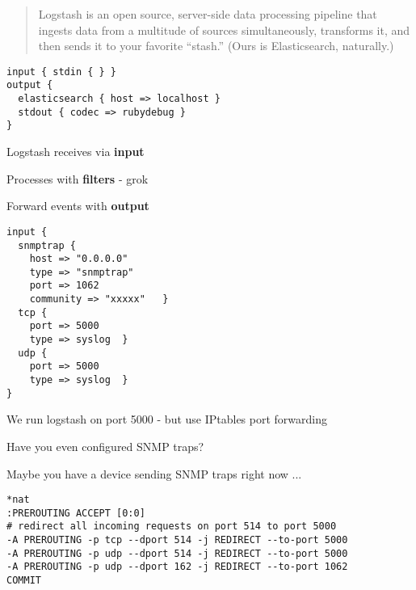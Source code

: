 \documentclass[Screen16to9,17pt]{foils}
\begin{document}

\begin{quote}
  Logstash is an open source, server-side data processing pipeline that ingests data from a multitude of sources simultaneously, transforms it, and then sends it to your favorite “stash.” (Ours is Elasticsearch, naturally.)\\
\end{quote}

\begin{verbatim}
input { stdin { } }
output {
  elasticsearch { host => localhost }
  stdout { codec => rubydebug }
}
\end{verbatim}



\begin{list2}
\item Logstash receives via {\bf input}
\item Processes with {\bf filters} - grok
\item Forward events with {\bf output}
\end{list2}



{\footnotesize
\begin{verbatim}
input {
  snmptrap {
    host => "0.0.0.0"
    type => "snmptrap"
    port => 1062
    community => "xxxxx"   }
  tcp {
    port => 5000
    type => syslog  }
  udp {
    port => 5000
    type => syslog  }
}
\end{verbatim}
}

\begin{list2}
\item We run logstash on port 5000 - but use IPtables port forwarding
\item Have you even configured SNMP traps?
\item Maybe you have a device sending SNMP traps right now ...
\end{list2}


{\footnotesize
\begin{verbatim}
*nat
:PREROUTING ACCEPT [0:0]
# redirect all incoming requests on port 514 to port 5000
-A PREROUTING -p tcp --dport 514 -j REDIRECT --to-port 5000
-A PREROUTING -p udp --dport 514 -j REDIRECT --to-port 5000
-A PREROUTING -p udp --dport 162 -j REDIRECT --to-port 1062
COMMIT
\end{verbatim}
}
\end{document}
